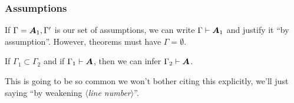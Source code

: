 \subsubsection{Assumptions}
If $\Gamma=\boldsymbol{A}_{1},\Gamma'$ is our set of assumptions, we
can write $\Gamma\vdash\boldsymbol{A}_{1}$ and justify it ``by assumption''.
However, theorems must have $\Gamma=\emptyset$.

\begin{theorem}[Weakening]
If $\Gamma_{1}\subset\Gamma_{2}$ and if $\Gamma_{1}\vdash\boldsymbol{A}$,
then we can infer $\Gamma_{2}\vdash\boldsymbol{A}$.
\end{theorem}
This is going to be so common we won't bother citing this explicitly,
we'll just saying ``by weakening $\langle$\textit{line number\/}$\rangle$''.
